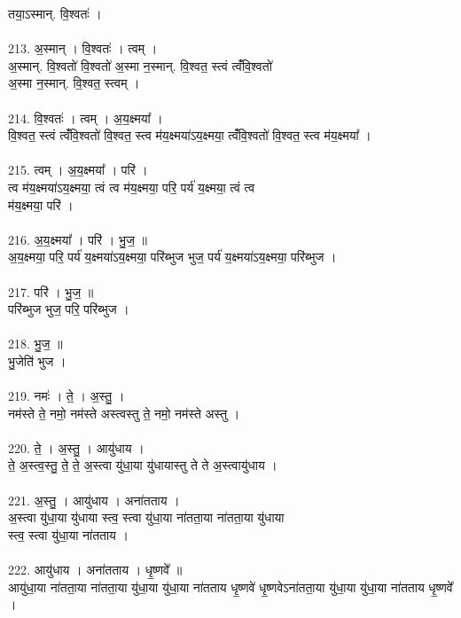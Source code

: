 तया॒ऽस्मान्. वि॒श्वतः॑ ।\\
\\
213. अ॒स्मान् । वि॒श्वतः॑ । त्वम् ।\\
अ॒स्मान्. वि॒श्वतो॑ वि॒श्वतो॑ अ॒स्मा न॒स्मान्. वि॒श्वत॒ स्त्वं त्वंँवि॒श्वतो॑\\
अ॒स्मा न॒स्मान्. वि॒श्वत॒ स्त्वम् ।\\
\\
214. वि॒श्वतः॑ । त्वम् । अ॒य॒क्ष्मया᳚ ।\\
वि॒श्वत॒ स्त्वं त्वंँवि॒श्वतो॑ वि॒श्वत॒ स्त्व म॑य॒क्ष्मया॑ऽय॒क्ष्मया॒ त्वंँवि॒श्वतो॑ वि॒श्वत॒ स्त्व म॑य॒क्ष्मया᳚ ।\\
\\
215. त्वम् । अ॒य॒क्ष्मया᳚ । परि॑ ।\\
त्व म॑य॒क्ष्मया॑ऽय॒क्ष्मया॒ त्वं त्व म॑य॒क्ष्मया॒ परि॒ पर्य॑ य॒क्ष्मया॒ त्वं त्व\\
म॑य॒क्ष्मया॒ परि॑ ।\\
\\
216. अ॒य॒क्ष्मया᳚ । परि॑ । भु॒ज॒ ॥\\
अ॒य॒क्ष्मया॒ परि॒ पर्य॑ य॒क्ष्मया॑ऽय॒क्ष्मया॒ परि॑ब्भुज भुज॒ पर्य॑ य॒क्ष्मया॑ऽय॒क्ष्मया॒ परि॑ब्भुज ।\\
\\
217. परि॑ । भु॒ज॒ ॥\\
परि॑ब्भुज भुज॒ परि॒ परि॑ब्भुज ।\\
\\
218. भु॒ज॒ ॥\\
भु॒जेति॑ भुज ।\\
\\
219. नमः॑ । ते॒ । अ॒स्तु॒ ।\\
नम॑स्ते ते॒ नमो॒ नम॑स्ते अस्त्वस्तु ते॒ नमो॒ नम॑स्ते अस्तु ।\\
\\
220. ते॒ । अ॒स्तु॒ । आयु॑धाय ।\\
ते॒ अ॒स्त्व॒स्तु॒ ते॒ ते॒ अ॒स्त्वा यु॑धा॒या यु॑धायास्तु ते ते अ॒स्त्वायु॑धाय ।\\
\\
221. अ॒स्तु॒ । आयु॑धाय । अना॑तताय ।\\
अ॒स्त्वा यु॑धा॒या यु॑धाया स्त्व॒ स्त्वा यु॑धा॒या ना॑तता॒या ना॑तता॒या यु॑धाया\\
स्त्व॒ स्त्वा यु॑धा॒या ना॑तताय ।\\
\\
222. आयु॑धाय । अना॑तताय । धृ॒ष्णवे᳚ ॥\\
आयु॑धा॒या ना॑तता॒या ना॑तता॒या यु॑धा॒या यु॑धा॒या ना॑तताय धृ॒ष्णवे॑ धृ॒ष्णवेऽना॑तता॒या यु॑धा॒या यु॑धा॒या ना॑तताय धृ॒ष्णवे᳚ ।\\
